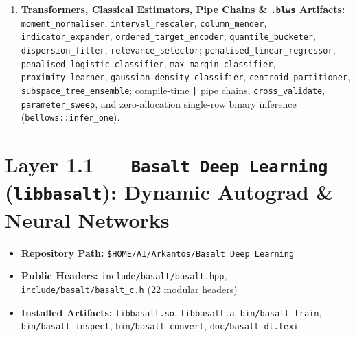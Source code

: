 \documentclass[11pt,a4paper]{article}
\begin{document}
\begin{enumerate}[leftmargin=1.5em]
\begin{itemize}
  \end{itemize}
  \item \textbf{Transformers, Classical Estimators, Pipe Chains \& \texttt{.blws} Artifacts:} \texttt{moment\_normaliser}, \texttt{interval\_rescaler}, \texttt{column\_mender}, \texttt{indicator\_expander}, \texttt{ordered\_target\_encoder}, \texttt{quantile\_bucketer}, \texttt{dispersion\_filter}, \texttt{relevance\_selector}; \texttt{penalised\_linear\_regressor}, \texttt{penalised\_logistic\_classifier}, \texttt{max\_margin\_classifier}, \texttt{proximity\_learner}, \texttt{gaussian\_density\_classifier}, \texttt{centroid\_partitioner}, \texttt{subspace\_tree\_ensemble}; compile-time \texttt{|} pipe chains, \texttt{cross\_validate}, \texttt{parameter\_sweep}, and zero-allocation single-row binary inference (\texttt{bellows::infer\_one}).
\end{enumerate}

\section{Layer 1.1 --- \texttt{Basalt Deep Learning} (\texttt{libbasalt}): Dynamic Autograd \& Neural Networks}

\begin{itemize}[leftmargin=1.5em,itemsep=1pt]
  \item \textbf{Repository Path:} \texttt{\$HOME/AI/Arkantos/Basalt Deep Learning}
  \item \textbf{Public Headers:} \texttt{include/basalt/basalt.hpp}, \texttt{include/basalt/basalt\_c.h} (22 modular headers)
  \item \textbf{Installed Artifacts:} \texttt{libbasalt.so}, \texttt{libbasalt.a}, \texttt{bin/basalt-train}, \texttt{bin/basalt-inspect}, \texttt{bin/basalt-convert}, \texttt{doc/basalt-dl.texi}
\end{itemize}
\end{document}
